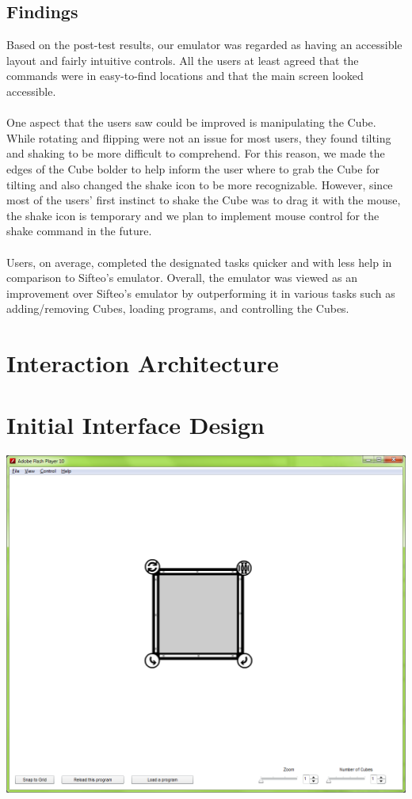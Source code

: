 \documentclass[12pt]{article}
\begin{document}
\subsection{Findings}
Based on the post-test results, our emulator was regarded as having an accessible layout and fairly intuitive controls.  All the users at least agreed that the commands were in easy-to-find locations and that the main screen looked accessible. \\\\
One aspect that the users saw could be improved is manipulating the Cube.  While rotating and flipping were not an issue for most users, they found tilting and shaking to be more difficult to comprehend.  For this reason, we made the edges of the Cube bolder to help inform the user where to grab the Cube for tilting and also changed the shake icon to be more recognizable.  However, since most of the users’ first instinct to shake the Cube was to drag it with the mouse, the shake icon is temporary and we plan to implement mouse control for the shake command in the future. \\\\
Users, on average, completed the designated tasks quicker and with less help in comparison to Sifteo’s emulator.  Overall, the emulator was viewed as an improvement over Sifteo’s emulator by outperforming it in various tasks such as adding/removing Cubes, loading programs, and controlling the Cubes.

\section{Interaction Architecture}


\section{Initial Interface Design}
\begin{center}
  \includegraphics[scale=.4]{../prototype/prototype1.png}
\end{center}
\end{document}
